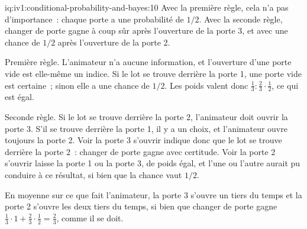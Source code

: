\begin{solution}{iq:iv1:conditional-probability-and-bayes:10}
Avec la première règle, cela n'a pas d'importance~: chaque porte a une probabilité de $1/2$. Avec la seconde règle, changer de porte gagne à coup sûr après l'ouverture de la porte 3, et avec une chance de $1/2$ après l'ouverture de la porte 2.

Première règle. L'animateur n'a aucune information, et l'ouverture d'une porte vide est elle-même un indice. Si le lot se trouve derrière la porte 1, une porte vide est certaine~; sinon elle a une chance de $1/2$. Les poids valent donc $\tfrac13 : \tfrac23 \cdot \tfrac12$, ce qui est égal.

Seconde règle. Si le lot se trouve derrière la porte 2, l'animateur doit ouvrir la porte 3. S'il se trouve derrière la porte 1, il y a un choix, et l'animateur ouvre toujours la porte 2. Voir la porte 3 s'ouvrir indique donc que le lot se trouve derrière la porte 2~: changer de porte gagne avec certitude. Voir la porte 2 s'ouvrir laisse la porte 1 ou la porte 3, de poids égal, et l'une ou l'autre aurait pu conduire à ce résultat, si bien que la chance vaut $1/2$.

En moyenne sur ce que fait l'animateur, la porte 3 s'ouvre un tiers du temps et la porte 2 s'ouvre les deux tiers du temps, si bien que changer de porte gagne $\tfrac13 \cdot 1 + \tfrac23 \cdot \tfrac12 = \tfrac23$, comme il se doit.

\end{solution}

